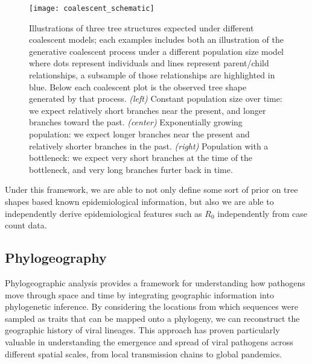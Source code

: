 \begin{figure}[ht]
  \centering
  \texttt{[image: coalescent\_schematic]}
  \caption[Demography effects tree shape]{Illustrations of three tree structures expected under different coalescent models; each examples includes both an illustration of the generative coalescent process under a different population size model where dots represent individuals and lines represent parent/child relationships, a subsample of those relationships are highlighted in blue. Below each coalescent plot is the observed tree shape generated by that process. \textit{(left)} Constant population size over time: we expect relatively short branches near the present, and longer branches toward the past. \textit{(center)} Exponentially growing population: we expect longer branches near the present and relatively shorter branches in the past. \textit{(right)} Population with a bottleneck: we expect very short branches at the time of the bottleneck, and very long branches furter back in time.
  }
  \label{fig:coalescentOverview}
\end{figure}

Under this framework, we are able to not only define some sort of prior on tree shapes based known epidemiological information, but also we are able to independently derive epidemiological features such as $R_0$ independently from case count data.

\subsection{Phylogeography}\label{ssec:phylogeography}
Phylogeographic analysis provides a framework for understanding how pathogens move through space and time by integrating geographic information into phylogenetic inference.
By considering the locations from which sequences were sampled as traits that can be mapped onto a phylogeny, we can reconstruct the geographic history of viral lineages.
This approach has proven particularly valuable in understanding the emergence and spread of viral pathogens across different spatial scales, from local transmission chains to global pandemics.

